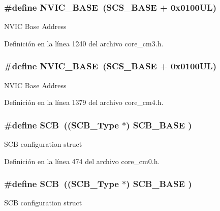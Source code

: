 \subsubsection[{\texorpdfstring{N\+V\+I\+C\+\_\+\+B\+A\+SE}{NVIC_BASE}}]{\setlength{\rightskip}{0pt plus 5cm}\#define N\+V\+I\+C\+\_\+\+B\+A\+SE~({\bf S\+C\+S\+\_\+\+B\+A\+SE} +  0x0100\+U\+L)}\hypertarget{group___c_m_s_i_s__core__base_gaa0288691785a5f868238e0468b39523d}{}\label{group___c_m_s_i_s__core__base_gaa0288691785a5f868238e0468b39523d}
N\+V\+IC Base Address 

Definición en la línea 1240 del archivo core\+\_\+cm3.\+h.

\subsubsection[{\texorpdfstring{N\+V\+I\+C\+\_\+\+B\+A\+SE}{NVIC_BASE}}]{\setlength{\rightskip}{0pt plus 5cm}\#define N\+V\+I\+C\+\_\+\+B\+A\+SE~({\bf S\+C\+S\+\_\+\+B\+A\+SE} +  0x0100\+U\+L)}\hypertarget{group___c_m_s_i_s__core__base_gaa0288691785a5f868238e0468b39523d}{}\label{group___c_m_s_i_s__core__base_gaa0288691785a5f868238e0468b39523d}
N\+V\+IC Base Address 

Definición en la línea 1379 del archivo core\+\_\+cm4.\+h.

\subsubsection[{\texorpdfstring{S\+CB}{SCB}}]{\setlength{\rightskip}{0pt plus 5cm}\#define S\+CB~(({\bf S\+C\+B\+\_\+\+Type}       $\ast$)     {\bf S\+C\+B\+\_\+\+B\+A\+SE}      )}\hypertarget{group___c_m_s_i_s__core__base_gaaaf6477c2bde2f00f99e3c2fd1060b01}{}\label{group___c_m_s_i_s__core__base_gaaaf6477c2bde2f00f99e3c2fd1060b01}
S\+CB configuration struct 

Definición en la línea 474 del archivo core\+\_\+cm0.\+h.

\subsubsection[{\texorpdfstring{S\+CB}{SCB}}]{\setlength{\rightskip}{0pt plus 5cm}\#define S\+CB~(({\bf S\+C\+B\+\_\+\+Type}       $\ast$)     {\bf S\+C\+B\+\_\+\+B\+A\+SE}      )}\hypertarget{group___c_m_s_i_s__core__base_gaaaf6477c2bde2f00f99e3c2fd1060b01}{}\label{group___c_m_s_i_s__core__base_gaaaf6477c2bde2f00f99e3c2fd1060b01}
S\+CB configuration struct 


